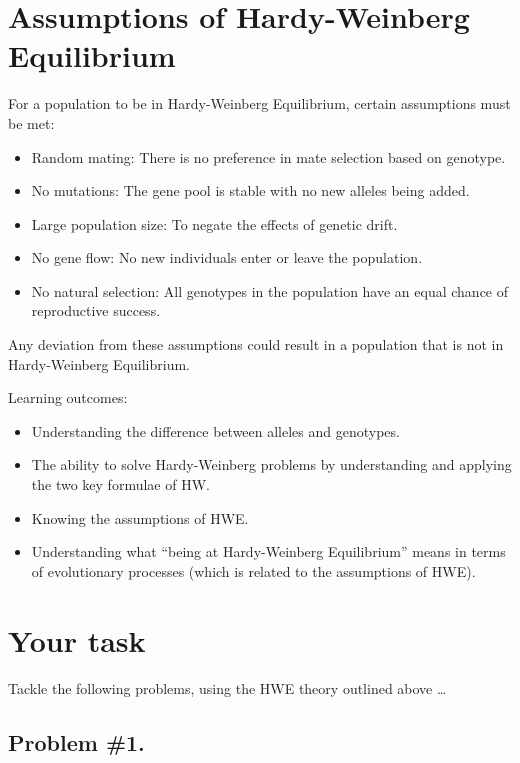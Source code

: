 \documentclass[
  a4paper]{book}
\providecommand{\tightlist}{%
  \setlength{\itemsep}{0pt}\setlength{\parskip}{0pt}}
\begin{document}
\section{Assumptions of Hardy-Weinberg Equilibrium}\label{assumptions-of-hardy-weinberg-equilibrium}

For a population to be in Hardy-Weinberg Equilibrium, certain assumptions must be met:

\begin{itemize}
\tightlist
\item
  Random mating: There is no preference in mate selection based on genotype.
\item
  No mutations: The gene pool is stable with no new alleles being added.
\item
  Large population size: To negate the effects of genetic drift.
\item
  No gene flow: No new individuals enter or leave the population.
\item
  No natural selection: All genotypes in the population have an equal chance of reproductive success.
\end{itemize}

Any deviation from these assumptions could result in a population that is not in Hardy-Weinberg Equilibrium.

\begin{do-something}
Learning outcomes:

\begin{itemize}
\tightlist
\item
  Understanding the difference between alleles and genotypes.
\item
  The ability to solve Hardy-Weinberg problems by understanding and
  applying the two key formulae of HW.
\item
  Knowing the assumptions of HWE.
\item
  Understanding what ``being at Hardy-Weinberg Equilibrium'' means in
  terms of evolutionary processes (which is related to the assumptions
  of HWE).
\end{itemize}
\end{do-something}

\section{Your task}\label{your-task-11}

Tackle the following problems, using the HWE theory outlined above \ldots{}

\subsection{Problem \#1.}\label{problem-1.}
\end{document}
